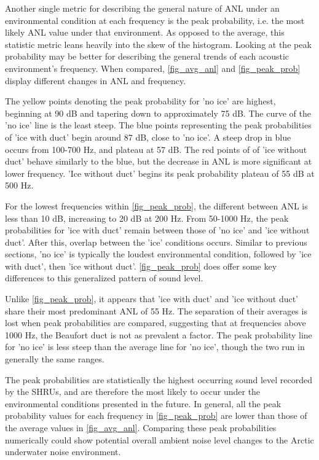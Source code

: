 Another single metric for describing the general nature of ANL under an environmental condition at each frequency is the peak probability, i.e. the most likely ANL value under that environment. As opposed to the average, this statistic metric leans heavily into the skew of the histogram. Looking at the peak probability may be better for describing the general trends of each acoustic environment's frequency. When compared, \autoref{fig_avg_anl} and \autoref{fig_peak_prob} display different changes in ANL and frequency. 

The yellow points denoting the peak probability for 'no ice' are highest, beginning at  90 dB and tapering down to approximately 75 dB. The curve of the 'no ice' line is the least steep. The blue points representing the peak probabilities of 'ice with duct' begin around 87 dB, close to 'no ice'. A steep drop in blue occurs from 100-700 Hz, and plateau at 57 dB. The red points of of 'ice without duct' behave similarly to the blue, but the decrease in ANL is more significant at lower frequency. 'Ice without duct' begins its peak probability plateau of 55 dB at 500 Hz.

For the lowest frequencies within \autoref{fig_peak_prob}, the different between ANL is less than 10 dB, increasing to 20 dB at 200 Hz. From 50-1000 Hz, the peak probabilities for 'ice with duct' remain between those of 'no ice' and 'ice without duct'. After this, overlap between the 'ice' conditions occurs. Similar to previous sections, 'no ice' is typically the loudest environmental condition, followed by 'ice with duct', then 'ice without duct'. \autoref{fig_peak_prob} does offer some key differences to this generalized pattern of sound level.

Unlike \autoref{fig_peak_prob}, it appears that 'ice with duct' and 'ice without duct' share their most predominant ANL of 55 Hz. The separation of their averages is lost when peak probabilities are compared, suggesting that at frequencies above 1000 Hz, the Beaufort duct is not as prevalent a factor. The peak probability line for 'no ice' is less steep than the average line for 'no ice', though the two run in generally the same ranges. 

The peak probabilities are statistically the highest occurring sound level recorded by the SHRUs, and are therefore the most likely to occur under the environmental conditions presented in the future. In general, all the peak probability values for each frequency in \autoref{fig_peak_prob} are lower than those of the average values in \autoref{fig_avg_anl}. Comparing these peak probabilities numerically could show potential overall ambient noise level changes to the Arctic underwater noise environment.  


